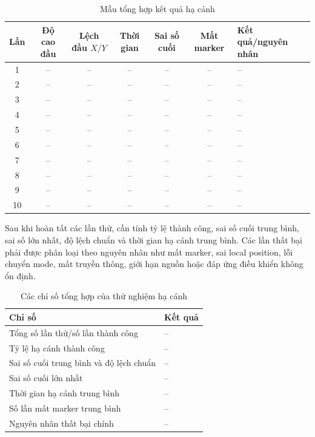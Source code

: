 \begin{table}[H]
    \centering
    \scriptsize
    \caption{Mẫu tổng hợp kết quả hạ cánh}
    \label{tab:landing_trials}
    \begin{tabularx}{\textwidth}{c c c c c c X}
        \toprule
        \textbf{Lần} & \textbf{Độ cao đầu} & \textbf{Lệch đầu $X/Y$} & \textbf{Thời gian} & \textbf{Sai số cuối} & \textbf{Mất marker} & \textbf{Kết quả/nguyên nhân} \\
        \midrule
        1 & -- & -- & -- & -- & -- & -- \\
        2 & -- & -- & -- & -- & -- & -- \\
        3 & -- & -- & -- & -- & -- & -- \\
        4 & -- & -- & -- & -- & -- & -- \\
        5 & -- & -- & -- & -- & -- & -- \\
        6 & -- & -- & -- & -- & -- & -- \\
        7 & -- & -- & -- & -- & -- & -- \\
        8 & -- & -- & -- & -- & -- & -- \\
        9 & -- & -- & -- & -- & -- & -- \\
        10 & -- & -- & -- & -- & -- & -- \\
        \bottomrule
    \end{tabularx}
\end{table}

Sau khi hoàn tất các lần thử, cần tính tỷ lệ thành công, sai số cuối trung bình, sai số lớn nhất, độ lệch chuẩn và thời gian hạ cánh trung bình. Các lần thất bại phải được phân loại theo nguyên nhân như mất marker, sai local position, lỗi chuyển mode, mất truyền thông, giới hạn nguồn hoặc đáp ứng điều khiển không ổn định.

\begin{table}[H]
    \centering
    \small
    \caption{Các chỉ số tổng hợp của thử nghiệm hạ cánh}
    \label{tab:landing_summary}
    \begin{tabularx}{\textwidth}{>{\raggedright\arraybackslash}p{} X}
        \toprule
        \textbf{Chỉ số} & \textbf{Kết quả} \\
        \midrule
        Tổng số lần thử/số lần thành công & -- \\
        Tỷ lệ hạ cánh thành công & -- \\
        Sai số cuối trung bình và độ lệch chuẩn & -- \\
        Sai số cuối lớn nhất & -- \\
        Thời gian hạ cánh trung bình & -- \\
        Số lần mất marker trung bình & -- \\
        Nguyên nhân thất bại chính & -- \\
        \bottomrule
    \end{tabularx}
\end{table}

